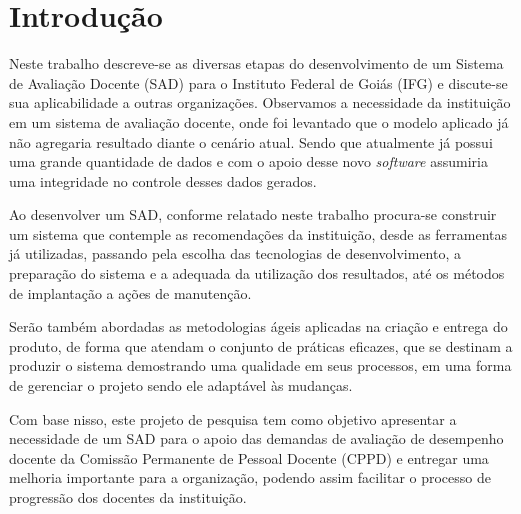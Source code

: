 \chapter{Introdução} \label{introdução}
    Neste trabalho descreve-se as diversas etapas do desenvolvimento de um Sistema de Avaliação Docente (SAD) para o Instituto Federal de Goiás (IFG) e discute-se sua aplicabilidade a outras organizações. Observamos a necessidade da instituição em um sistema de avaliação docente, onde foi levantado que o modelo aplicado já não agregaria resultado diante o cenário atual. Sendo que atualmente já possui uma grande quantidade de dados e com o apoio desse novo \textit{software} assumiria uma integridade no controle desses dados gerados.
       
    Ao desenvolver um SAD, conforme relatado neste trabalho procura-se construir um sistema que contemple as recomendações da instituição, desde as ferramentas já utilizadas, passando pela escolha das tecnologias de desenvolvimento, a preparação do sistema e a adequada da utilização dos resultados, até os métodos de implantação a ações de manutenção.
       
    Serão também abordadas as metodologias ágeis aplicadas na criação e entrega do produto, de forma que atendam o conjunto de práticas eficazes, que se destinam a produzir o sistema demostrando uma qualidade em seus processos, em uma forma de gerenciar o projeto sendo ele adaptável às mudanças.
       
    Com base nisso, este projeto de pesquisa tem como objetivo apresentar a necessidade de um SAD para o apoio das demandas de avaliação de desempenho docente da Comissão Permanente de Pessoal Docente (CPPD) e entregar uma melhoria importante para a organização, podendo assim facilitar o processo de progressão dos docentes da instituição. 
       
       
       
       
       

    

